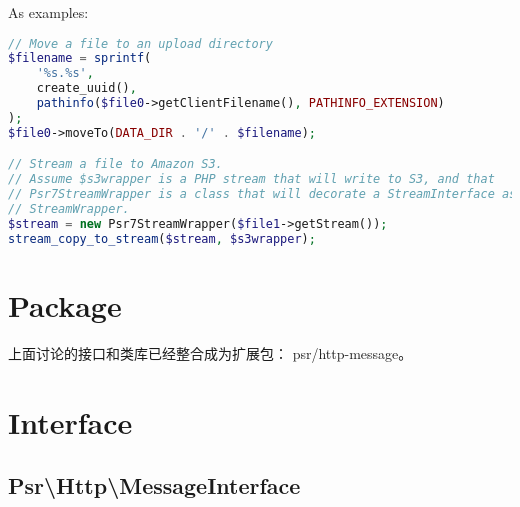 As examples:



\begin{lstlisting}[language=PHP]
// Move a file to an upload directory
$filename = sprintf(
    '%s.%s',
    create_uuid(),
    pathinfo($file0->getClientFilename(), PATHINFO_EXTENSION)
);
$file0->moveTo(DATA_DIR . '/' . $filename);

// Stream a file to Amazon S3.
// Assume $s3wrapper is a PHP stream that will write to S3, and that
// Psr7StreamWrapper is a class that will decorate a StreamInterface as a PHP
// StreamWrapper.
$stream = new Psr7StreamWrapper($file1->getStream());
stream_copy_to_stream($stream, $s3wrapper);
\end{lstlisting}

\section{Package}

上面讨论的接口和类库已经整合成为扩展包： psr/http-message。


\section{Interface}

\subsection{Psr\textbackslash Http\textbackslash MessageInterface}




